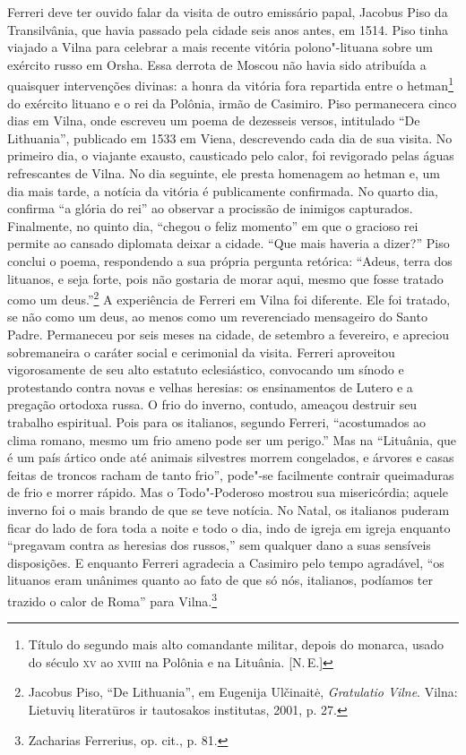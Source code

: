 Ferreri deve ter ouvido falar da visita de outro emissário papal,
Jacobus Piso da Transilvânia, que havia passado pela cidade seis anos
antes, em 1514. Piso tinha viajado a Vilna para celebrar a mais recente
vitória polono"-lituana sobre um exército russo em Orsha. Essa derrota de
Moscou não havia sido atribuída a quaisquer intervenções divinas: a
honra da vitória fora repartida entre o hetman\footnote{Título do segundo mais alto comandante militar, depois do monarca, usado do século \textsc{xv} ao \textsc{xviii} na Polônia e na Lituânia. [N.\,E.]} do exército lituano e o
rei da Polônia, irmão de Casimiro. Piso permanecera cinco dias em Vilna,
onde escreveu um poema de dezesseis versos, intitulado ``De Lithuania'',
publicado em 1533 em Viena, descrevendo cada dia de sua visita. No
primeiro dia, o viajante exausto, causticado pelo calor, foi revigorado
pelas águas refrescantes de Vilna. No dia seguinte, ele presta homenagem
ao hetman e, um dia mais tarde, a notícia da vitória é publicamente
confirmada. No quarto dia, confirma ``a glória do rei'' ao observar a
procissão de inimigos capturados. Finalmente, no quinto dia, ``chegou o
feliz momento'' em que o gracioso rei permite ao cansado diplomata
deixar a cidade. ``Que mais haveria a dizer?'' Piso conclui o poema,
respondendo a sua própria pergunta retórica: ``Adeus, terra dos
lituanos, e seja forte, pois não gostaria de morar aqui, mesmo que fosse
tratado como um deus.''\footnote{Jacobus Piso, ``De Lithuania'', em Eugenija Ulčinaitė, \textit{Gratulatio Vilne}. Vilna: Lietuvių literatūros ir tautosakos institutas, 2001, p. 27.}
A experiência de Ferreri em Vilna foi diferente. Ele foi tratado, se não
como um deus, ao menos como um reverenciado mensageiro do Santo Padre.
Permaneceu por seis meses na cidade, de setembro a fevereiro, e apreciou
sobremaneira o caráter social e cerimonial da visita. Ferreri aproveitou
vigorosamente de seu alto estatuto eclesiástico, convocando um sínodo e
protestando contra novas e velhas heresias: os ensinamentos de Lutero e
a pregação ortodoxa russa. O frio do inverno, contudo, ameaçou destruir
seu trabalho espiritual. Pois para os italianos, segundo Ferreri,
``acostumados ao clima romano, mesmo um frio ameno pode ser um perigo.''
Mas na ``Lituânia, que é um país ártico onde até animais silvestres
morrem congelados, e árvores e casas feitas de troncos racham de tanto
frio'', pode"-se facilmente contrair queimaduras de frio e morrer rápido.
Mas o Todo"-Poderoso mostrou sua misericórdia; aquele inverno foi o mais
brando de que se teve notícia. No Natal, os italianos puderam ficar do
lado de fora toda a noite e todo o dia, indo de igreja em igreja
enquanto ``pregavam contra as heresias dos russos,'' sem qualquer dano a
suas sensíveis disposições. E enquanto Ferreri agradecia a Casimiro pelo
tempo agradável, ``os lituanos eram unânimes quanto ao fato de que só
nós, italianos, podíamos ter trazido o calor de Roma'' para
Vilna.\footnote{Zacharias Ferrerius, op. cit., p. 81.}

